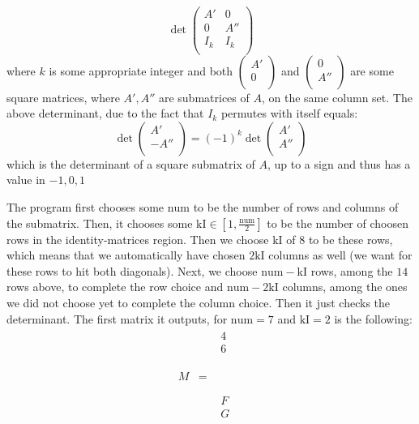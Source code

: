 \documentclass[12pt]{article}
\newenvironment{a_enum}{\begin{enumerate}[label=(\alph{*})]}{\end{enumerate}} %
\newenvironment{b_item}{\begin{itemize}}{\end{itemize}} %
\begin{document}
\begin{a_enum}
\begin{b_item}
$$\det\left(\begin{array}{c|c}A'&0\\0&A''\\\hline I_k&I_k\\\end{array}\right)$$
where $k$ is some appropriate integer and both $\left(\begin{array}{c}A'\\0\\\end{array}\right)$ and $\left(\begin{array}{c}0\\A''\\\end{array}\right)$ are some square matrices, where $A',A''$ are submatrices of $A$, on the same column set. The above determinant, due to the fact that $I_k$ permutes with itself equals:
$$\det\left(\begin{array}{c}A'\\-A''\\\end{array}\right)=(-1)^k\det\left(\begin{array}{c}A'\\A''\\\end{array}\right)$$
which is the determinant of a square submatrix of $A$, up to a sign and thus has a value in $-1,0,1$
\end{b_item}
The program first chooses some $\mathrm{num}$ to be the number of rows and columns of the submatrix. Then, it chooses some $\mathrm{kI}\in\left[1,\frac{\mathrm{num}}{2}\right]$ to be the number of choosen rows in the identity-matrices region. Then we choose $\mathrm{kI}$ of $8$ to be these rows, which means that we automatically have chosen $2\mathrm{kI}$ columns as well (we want for these rows to hit both diagonals). Next, we choose $\mathrm{num}-\mathrm{kI}$ rows, among the $14$ rows above, to complete the row choice and $\mathrm{num}-2\mathrm{kI}$ columns, among the ones we did not choose yet to complete the column choice. Then it just checks the determinant.
The first matrix it outputs, for $\mathrm{num}=7$ and $\mathrm{kI}=2$ is the following:
$$\begin{array}{ccccccc}M&=&\begin{array}{c}4\\6\\\phantom{A}\\\phantom{A}\\\phantom{A}\\F\\G\\\end{array}&

\end{array}$$
\end{a_enum}
\end{document}
